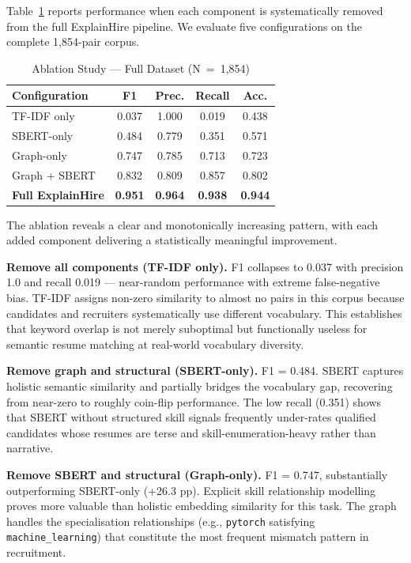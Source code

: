 \documentclass[conference]{IEEEtran}
\begin{document}
Table~\ref{tab:ablation} reports performance when each component is
systematically removed from the full ExplainHire pipeline. We evaluate
five configurations on the complete 1,854-pair corpus.

\begin{table}[htbp]
\caption{Ablation Study --- Full Dataset (N~=~1,854)}
\label{tab:ablation}
\centering
\renewcommand{\arraystretch}{1.1}
\begin{tabular}{lcccc}
\toprule
\textbf{Configuration} & \textbf{F1} & \textbf{Prec.} & \textbf{Recall} & \textbf{Acc.} \\
\midrule
TF-IDF only              & 0.037 & 1.000 & 0.019 & 0.438 \\
SBERT-only               & 0.484 & 0.779 & 0.351 & 0.571 \\
Graph-only               & 0.747 & 0.785 & 0.713 & 0.723 \\
Graph + SBERT            & 0.832 & 0.809 & 0.857 & 0.802 \\
\textbf{Full ExplainHire}& \textbf{0.951} & \textbf{0.964} & \textbf{0.938} & \textbf{0.944} \\
\bottomrule
\end{tabular}
\end{table}

The ablation reveals a clear and monotonically increasing pattern, with each
added component delivering a statistically meaningful improvement.

\textbf{Remove all components (TF-IDF only).}
F1 collapses to 0.037 with precision 1.0 and recall 0.019 ---
near-random performance with extreme false-negative bias. TF-IDF assigns
non-zero similarity to almost no pairs in this corpus because candidates
and recruiters systematically use different vocabulary. This establishes
that keyword overlap is not merely suboptimal but functionally useless
for semantic resume matching at real-world vocabulary diversity.

\textbf{Remove graph and structural (SBERT-only).}
F1 = 0.484. SBERT captures holistic semantic similarity and partially
bridges the vocabulary gap, recovering from near-zero to roughly coin-flip
performance. The low recall (0.351) shows that SBERT without structured
skill signals frequently under-rates qualified candidates whose resumes
are terse and skill-enumeration-heavy rather than narrative.

\textbf{Remove SBERT and structural (Graph-only).}
F1 = 0.747, substantially outperforming SBERT-only (+26.3 pp).
Explicit skill relationship modelling proves more valuable than holistic
embedding similarity for this task. The graph handles the specialisation
relationships (e.g., \texttt{pytorch} satisfying \texttt{machine\_learning})
that constitute the most frequent mismatch pattern in recruitment.
\end{document}
